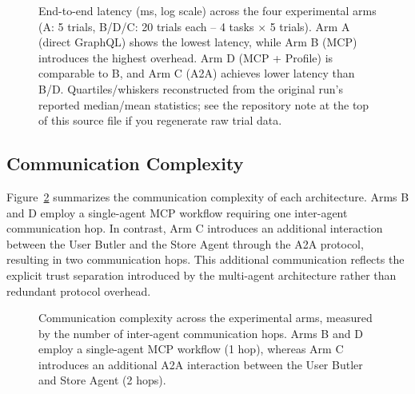 \documentclass[conference]{IEEEtran}
\begin{document}
\begin{figure}[t]
\centering
{}
\caption{End-to-end latency (ms, log scale) across the four experimental
arms (A: 5 trials, B/D/C: 20 trials each -- 4 tasks $\times$ 5 trials). Arm A
(direct GraphQL) shows the lowest latency, while Arm B (MCP) introduces the
highest overhead. Arm D (MCP + Profile) is comparable to B, and Arm C (A2A)
achieves lower latency than B/D. Quartiles/whiskers reconstructed from the
original run's reported median/mean statistics; see the repository note at
the top of this source file if you regenerate raw trial data.}
\label{fig:e2e-latency}
\end{figure}

\subsection{Communication Complexity}

Figure~\ref{fig:comm} summarizes the communication complexity of each
architecture. Arms B and D employ a single-agent MCP workflow requiring one
inter-agent communication hop. In contrast, Arm C introduces an additional
interaction between the User Butler and the Store Agent through the A2A
protocol, resulting in two communication hops. This additional communication
reflects the explicit trust separation introduced by the multi-agent
architecture rather than redundant protocol overhead.

\begin{figure}[t]
\centering
{}
\caption{Communication complexity across the experimental arms, measured by
the number of inter-agent communication hops. Arms B and D employ a
single-agent MCP workflow (1 hop), whereas Arm C introduces an additional A2A
interaction between the User Butler and Store Agent (2 hops).}
\label{fig:comm}
\end{figure}
\end{document}
